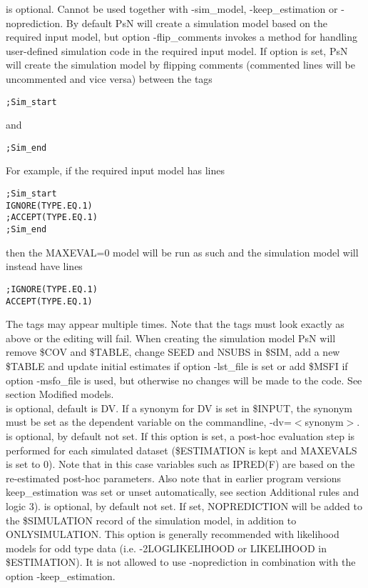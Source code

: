 \begin{optionlist}
\nextopt
{}
is optional. Cannot be used together with -sim\_model, -keep\_estimation or -noprediction. By default PsN will create a simulation model based on the  required input model, but option -flip\_comments invokes a method for handling user-defined simulation code in the required input model. If option is set, PsN will create the simulation model by flipping comments (commented lines will be uncommented and vice versa) between the tags


\begin{verbatim}
;Sim_start
\end{verbatim}
and 
\begin{verbatim}
;Sim_end
\end{verbatim}
For example, if the required input model has lines
\begin{verbatim}
;Sim_start 
IGNORE(TYPE.EQ.1)
;ACCEPT(TYPE.EQ.1) 
;Sim_end
\end{verbatim}
then the MAXEVAL=0 model will be run as such and the simulation model will instead have lines
\begin{verbatim}
;IGNORE(TYPE.EQ.1)
ACCEPT(TYPE.EQ.1) 
\end{verbatim}
The tags may appear multiple times. Note that the tags must look exactly  as above or the editing will fail. When creating the simulation model PsN will remove \$COV and \$TABLE, change SEED and NSUBS in \$SIM, add a new \$TABLE and  update initial estimates if option -lst\_file is set or add \$MSFI if option -msfo\_file is used, but otherwise no changes will be made to the code. See section Modified models.\\
\nextopt
{}
is optional, default is DV. If a synonym for DV is set in \$INPUT, the synonym must be set as the dependent variable on the commandline, -dv=$<$synonym$>$. 
\nextopt
{}
is optional, by default not set. If this option is set, a post-hoc evaluation step is performed for each simulated dataset (\$ESTIMATION is kept and MAXEVALS is set to 0). Note that in this case variables such as IPRED(F) are based on the re-estimated post-hoc parameters. Also note that in earlier program versions keep\_estimation was set or unset automatically, see section Additional rules and logic 3). 
\nextopt
{}
is optional, by default not set. If set, NOPREDICTION will be added to the \$SIMULATION record of the simulation model, in addition to ONLYSIMULATION. This option is generally recommended with likelihood models for odd type data (i.e. -2LOGLIKELIHOOD or LIKELIHOOD in \$ESTIMATION). It is not allowed to use -noprediction in combination with the option \mbox{-keep\_estimation}. 

\end{optionlist}
